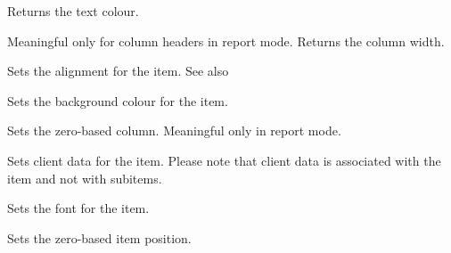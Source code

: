 \label{wxlistitemgettextcolour}


Returns the text colour.

\label{wxlistitemgetwidth}


Meaningful only for column headers in report mode. Returns the column width.

\label{wxlistitemsetalign}


Sets the alignment for the item. See also

\label{wxlistitemsetbackgroundcolour}


Sets the background colour for the item.

\label{wxlistitemsetcolumn}


Sets the zero-based column. Meaningful only in report mode.

\label{wxlistitemsetdata}



Sets client data for the item. Please note that
client data is associated with the item and not with subitems.

\label{wxlistitemsetfont}


Sets the font for the item.

\label{wxlistitemsetid}


Sets the zero-based item position.

\label{wxlistitemsetimage}


